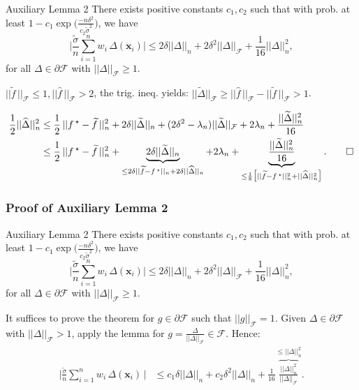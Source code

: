 \documentclass[11pt]{beamer}
\newcommand{\bx}{\mathbf{x}}
\newcommand{\cF}{\mathcal{F}}
\newcommand{\fstar}{f\,^\star}
\newcommand{\fhat}{\widehat{f}}
\newcommand{\ftilde}{\widetilde{f}}
\newcommand{\Dhat}{\widehat{\Delta}}
\newcommand{\Dtilde}{\widetilde{\Delta}}
\begin{document}
	\begin{frame}
		\begin{small}		
		\begin{block}{Auxiliary Lemma 2}			
			There exists positive constants $c_1, c_2$ such that with prob. at least $1 - c_1 \exp\big(\frac{-n\delta^2}{c_2 \tilde{\sigma}^2}\big)$, we have
			\begin{equation*}
				\Big|\frac{\tilde\sigma}{n} \sum_{i = 1}^{n} w_i\,\Delta(\bx_i)\Big| \leq 2\delta||\Delta||_n + 2\delta^2 ||\Delta||_\cF + \frac{1}{16} ||\Delta||_n^2,
			\end{equation*}
			for all $\Delta \in \partial \cF$ with $||\Delta||_\cF\geq 1$.
		\end{block}
	 	$||\ftilde\,||_\cF \leq 1, ||\fhat\,||_\cF > 2$, the trig. ineq. yields: $||\Dtilde||_\cF \geq ||\fhat\,||_\cF - ||\ftilde\,||_\cF > 1$.
	 	\vspace{0.2cm}
	 	
	 	\begin{align*}
	 	\frac{1}{2}||\Dhat||_n^2 &\leq \frac{1}{2} \,||\fstar - \ftilde\,||_n^2 + 2\delta||\Dtilde||_n + (2\delta^2 - \lambda_n)||\Dtilde||_\cF + 2\lambda_n + \frac{||\Dtilde||_n^2}{16}\\ 
	 	&\leq \frac{1}{2} \,||\fstar - \ftilde\,||_n^2 + \underbrace{2\delta||\Dtilde||_n}_{\leq 2\delta||\ftilde - \fstar||_n + 2\delta ||\Dhat||_n} +2\lambda_n+ \underbrace{\frac{||\Dtilde||_n^2}{16}}_{\leq \frac{1}{8}\big[||\ftilde - \fstar||_n^2 +||\Dhat||_n^2\big]}. \qed
		\end{align*}
	 	\end{small}
	\end{frame}

	\begin{frame}
		\frametitle{Proof of Auxiliary Lemma 2}
		\begin{small}		
		\begin{block}{Auxiliary Lemma 2}
			There exists positive constants $c_1, c_2$ such that with prob. at least $1 - c_1 \exp\big(\frac{-n\delta^2}{c_2 \tilde{\sigma}^2}\big)$, we have
			\begin{equation*}
			\Big|\frac{\tilde\sigma}{n} \sum_{i = 1}^{n} w_i\,\Delta(\bx_i)\Big| \leq 2\delta||\Delta||_n + 2\delta^2 ||\Delta||_\cF + \frac{1}{16} ||\Delta||_n^2,
			\end{equation*}
			for all $\Delta \in \partial \cF$ with $||\Delta||_\cF\geq 1$.
		\end{block}
		It suffices to prove the theorem for $g\in \partial\cF$ such that $||g||_\cF = 1$. Given $\Delta \in \partial \cF$ with $||\Delta||_\cF>1$, apply the lemma for $g = \frac{\Delta}{||\Delta||_\cF} \in \cF$. Hence:
		\begin{align*}
			\Big|\frac{\tilde \sigma}{n}\sum_{i = 1}^{n}w_i\,\Delta(\bx_i)\,\Big| &\leq c_1 \delta ||\Delta||_n + c_2\delta^2||\Delta||_n + \frac{1}{16}\overbrace{\frac{||\Delta||_n^2}{||\Delta||_\cF}}^{\leq ||\Delta||_n^2}.
		\end{align*}
		\end{small}
	\end{frame}
\end{document}
